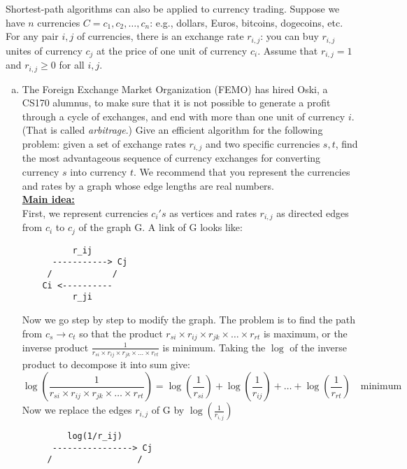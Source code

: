 \documentclass{article}\usepackage[utf8]{inputenc}
\begin{document}
\noindent Shortest-path algorithms can also be applied to currency trading. Suppose we have $n$ currencies $C = {c_1, c_2, \ldots , c_n}$: e.g., dollars, Euros, bitcoins, dogecoins, etc. For any pair $i, j$ of currencies, there is an exchange rate $r_{i, j}$: you can buy $r_{i, j}$ unites of currency $c_j$ at the price of one unit of currency $c_i$. Assume that $r_{i, j} = 1$ and $r_{i, j} \geq 0$ for all $i, j$.

\begin{enumerate}[(a)]
\item The Foreign Exchange Market Organization (FEMO) has hired Oski, a CS170 alumnus, to make sure that it is not possible to generate a profit through a cycle of exchanges, and end with more than one unit of currency $i$. (That is called \textit{arbitrage}.) Give an efficient algorithm for the following problem: given a set of exchange rates $r_{i, j}$ and two specific currencies $s, t$, find the most advantageous sequence of currency exchanges for converting currency $s$ into currency $t$. We recommend that you represent the currencies and rates by a graph whose edge lengths are real numbers.
\BeginSolution %
\\
\underline{\textbf{Main idea:}}\\
First, we represent currencies $c_i's$ as vertices and rates $r_{i,j}$ as directed edges from $c_i$ to $c_j$ of the graph G. A link of G looks like:
%
\begin{lstlisting}
	      r_ij
	  -----------> Cj
	 /            /
	Ci <----------
	      r_ji
\end{lstlisting}
%
Now we go step by step to modify the graph. The problem is to find the path from $c_s\rightarrow c_t$ so that the product $r_{si}\times r_{ij}\times r_{jk}\times\dots\times r_{rt}$ is maximum, or the inverse product $\displaystyle\frac{1}{r_{si}\times r_{ij}\times r_{jk}\times\dots\times r_{rt}}$ is minimum. Taking the $\log$ of the inverse product to decompose it into sum give:
%
\begin{equation*}
\log\left(\frac{1}{r_{si}\times r_{ij}\times r_{jk}\times\dots\times r_{rt}}\right) = \log\left(\frac{1}{r_{si}}\right) + \log\left(\frac{1}{r_{ij}}\right) + \dots + \log\left(\frac{1}{r_{rt}}\right)\quad\text{minimum}
\end{equation*}
%
Now we replace the edges $r_{i,j}$ of G by $\displaystyle\log\left(\frac{1}{r_{i,j}}\right)$
%
\begin{lstlisting}
	     log(1/r_ij)
	  ----------------> Cj
	 /                 /

\end{lstlisting}
\end{enumerate}
\end{document}
